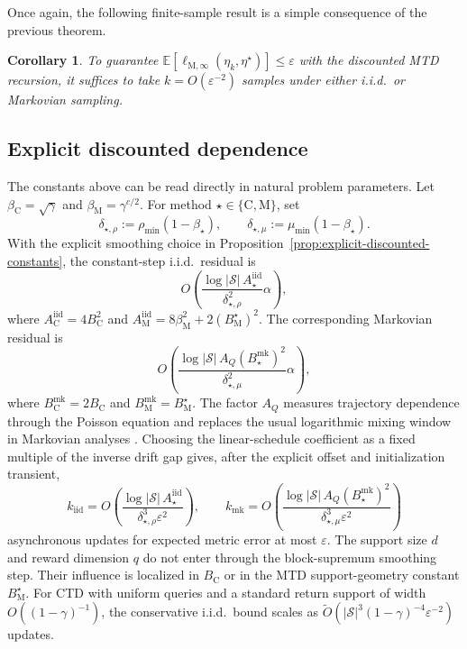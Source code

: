 \documentclass{article}
\newtheorem{corollary}[theorem]{Corollary}
\newcommand{\X}{\mathcal{S}}
\begin{document}
Once again, the following finite-sample result is a simple consequence of the previous theorem.
\begin{corollary}\label{cor:disc-mtd}
To guarantee
$\mathbb{E}[\ell_{\mathrm M,\infty}(\eta_k,\eta^\star)] \le \varepsilon$ with the discounted MTD recursion, it suffices to take $k = O(\varepsilon^{-2})$ samples under either i.i.d.\ or Markovian sampling.
\end{corollary}

\subsection{Explicit discounted dependence}
The constants above can be read directly in natural problem parameters. Let $\beta_{\mathrm C}=\sqrt\gamma$ and $\beta_{\mathrm M}=\gamma^{c/2}$. For method $\star\in\{\mathrm C,\mathrm M\}$, set
\begin{equation}
\delta_{\star,\rho}:=\rho_{\min}(1-\beta_\star),\qquad \delta_{\star,\mu}:=\mu_{\min}(1-\beta_\star).
\end{equation}
With the explicit smoothing choice in Proposition~\ref{prop:explicit-discounted-constants}, the constant-step i.i.d.\ residual is
\begin{equation}
O\left(\frac{\log\lvert\X\rvert\,A_\star^{\mathrm{iid}}}{\delta_{\star,\rho}^2}\alpha\right),
\end{equation}
where $A_{\mathrm C}^{\mathrm{iid}}=4B_{\mathrm C}^2$ and $A_{\mathrm M}^{\mathrm{iid}}=8\beta_{\mathrm M}^2+2(B_{\mathrm M}^\star)^2$. The corresponding Markovian residual is
\begin{equation}
O\left(\frac{\log\lvert\X\rvert\,A_Q(B_{\star}^{\mathrm{mk}})^2}{\delta_{\star,\mu}^2}\alpha\right),
\end{equation}
where $B_{\mathrm C}^{\mathrm{mk}}=2B_{\mathrm C}$ and $B_{\mathrm M}^{\mathrm{mk}}=B_{\mathrm M}^\star$. The factor $A_Q$ measures trajectory dependence through the Poisson equation and replaces the usual logarithmic mixing window in Markovian analyses \citep{chen2022finite, chen2024lyapunov}. Choosing the linear-schedule coefficient as a fixed multiple of the inverse drift gap gives, after the explicit offset and initialization transient,
\begin{equation}
k_{\mathrm{iid}}=O\left(\frac{\log\lvert\X\rvert\,A_\star^{\mathrm{iid}}}{\delta_{\star,\rho}^3\varepsilon^2}\right),\qquad k_{\mathrm{mk}}=O\left(\frac{\log\lvert\X\rvert\,A_Q(B_\star^{\mathrm{mk}})^2}{\delta_{\star,\mu}^3\varepsilon^2}\right)
\end{equation}
asynchronous updates for expected metric error at most $\varepsilon$. The support size $d$ and reward dimension $q$ do not enter through the block-supremum smoothing step. Their influence is localized in $B_{\mathrm C}$ or in the MTD support-geometry constant $B_{\mathrm M}^\star$. For CTD with uniform queries and a standard return support of width $O((1-\gamma)^{-1})$, the conservative i.i.d.\ bound scales as $\tilde O(\lvert\X\rvert^3(1-\gamma)^{-4}\varepsilon^{-2})$ updates.
\end{document}
